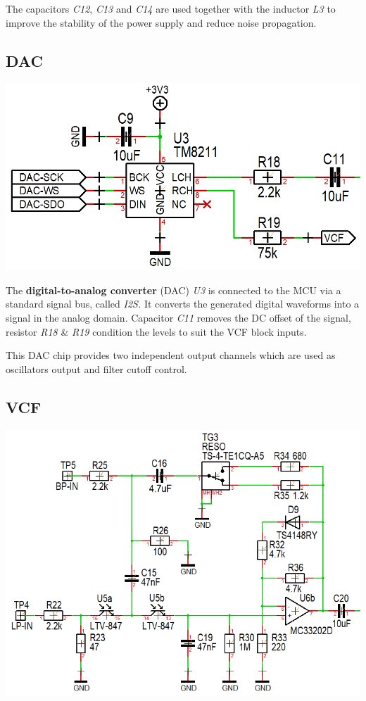 \documentclass{scrartcl}
\begin{document}
The capacitors \emph{C12}, \emph{C13} and \emph{C14} are used together with the inductor \emph{L3} to improve the stability of the power supply and reduce noise propagation.

\subsection{DAC}

\begin{center}
    \includegraphics[scale=0.30]{assets/schema-dac.png}
\end{center}

The \textbf{digital-to-analog converter} (DAC) \emph{U3} is connected to the MCU via a standard signal bus, called \emph{I2S.} It converts the generated digital waveforms into a signal in the analog domain. Capacitor \emph{C11} removes the DC offset of the signal, resistor \emph{R18} \& \emph{R19} condition the levels to suit the VCF block inputs.

This DAC chip provides two independent output channels which are used as oscillators output and filter cutoff control.

\subsection{VCF}

\begin{center}
    \includegraphics[scale=0.70]{assets/schema-vcf.png}
\end{center}
\vspace{0.25cm}
\end{document}
